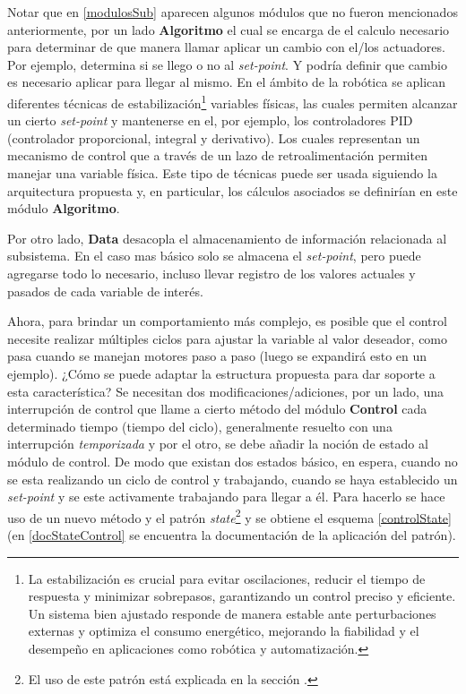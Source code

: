 Notar que en \ref{modulosSub} aparecen algunos módulos que no fueron mencionados anteriormente, por un lado \textbf{Algoritmo} el cual se encarga de el calculo necesario para determinar de que manera llamar aplicar un cambio con el/los actuadores. Por ejemplo, determina si se llego o no al \textit{set-point}. Y podría definir que cambio es necesario aplicar para llegar al mismo. En el ámbito de la robótica se aplican diferentes técnicas de estabilización\footnote{La estabilización es crucial para evitar oscilaciones, reducir el tiempo de respuesta y minimizar sobrepasos, garantizando un control preciso y eficiente. Un sistema bien ajustado responde de manera estable ante perturbaciones externas y optimiza el consumo energético, mejorando la fiabilidad y el desempeño en aplicaciones como robótica y automatización.} variables físicas, las cuales permiten alcanzar un cierto \textit{set-point} y mantenerse en el, por ejemplo, los controladores \gls{PID}\cite{pidlibro} (controlador proporcional, integral y derivativo). Los cuales representan un mecanismo de control que a través de un lazo de retroalimentación permiten manejar una variable física. Este tipo de técnicas puede ser usada siguiendo la arquitectura propuesta y, en particular, los cálculos asociados se definirían en este módulo \textbf{Algoritmo}.

Por otro lado, \textbf{Data} desacopla el almacenamiento de información relacionada al subsistema. En el caso mas básico solo se almacena el \textit{set-point}, pero puede agregarse todo lo necesario, incluso llevar registro de los valores actuales y pasados de cada variable de interés.

Ahora, para brindar un comportamiento más complejo, es posible que el control necesite realizar múltiples ciclos para ajustar la variable al valor deseador, como pasa cuando se manejan motores paso a paso (luego se expandirá esto en un ejemplo). ¿Cómo se puede adaptar la estructura propuesta para dar soporte a esta característica? Se necesitan dos modificaciones/adiciones, por un lado, una interrupción de control que llame a cierto método del módulo \textbf{Control} cada determinado tiempo (tiempo del ciclo), generalmente resuelto con una interrupción \textit{temporizada} y por el otro, se debe añadir la noción de estado al módulo de control. De modo que existan dos estados básico, en espera, cuando no se esta realizando un ciclo de control y trabajando, cuando se haya establecido un \textit{set-point} y se este activamente trabajando para llegar a él. Para hacerlo se hace uso de un nuevo método y el patrón \textit{state}\footnote{El uso de este patrón está explicada en la sección .} y se obtiene el esquema \ref{controlState} (en \ref{docStateControl} se encuentra la documentación de la aplicación del patrón).

